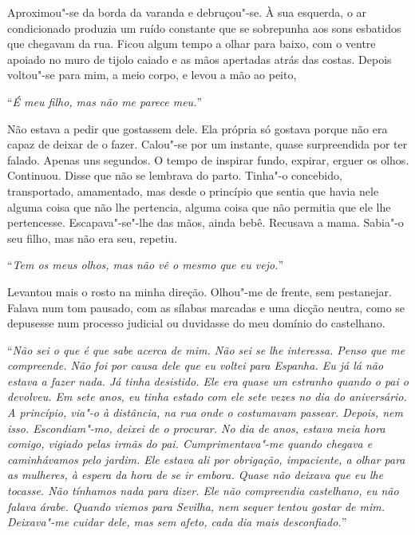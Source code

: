 Aproximou"-se da borda da varanda e debruçou"-se. À sua esquerda, o ar
condicionado produzia um ruído constante que se sobrepunha aos sons
esbatidos que chegavam da rua. Ficou algum tempo a olhar para baixo, com
o ventre apoiado no muro de tijolo caiado e as mãos apertadas atrás das
costas. Depois voltou"-se para mim, a meio corpo, e levou a mão ao
peito,

``\emph{É meu filho, mas não me parece meu.}''

Não estava a pedir que gostassem dele. Ela própria só gostava porque não
era capaz de deixar de o fazer. Calou"-se por um instante, quase
surpreendida por ter falado. Apenas uns segundos. O tempo de inspirar
fundo, expirar, erguer os olhos. Continuou. Disse que não se lembrava do
parto. Tinha"-o concebido, transportado, amamentado, mas desde o
princípio que sentia que havia nele alguma coisa que não lhe pertencia,
alguma coisa que não permitia que ele lhe pertencesse. Escapava"-se"-lhe
das mãos, ainda bebê. Recusava a mama. Sabia"-o seu filho, mas não era
seu, repetiu.

``\emph{Tem os meus olhos, mas não vê o mesmo que eu vejo.}''

Levantou mais o rosto na minha direção. Olhou"-me de frente, sem
pestanejar. Falava num tom pausado, com as sílabas marcadas e uma dicção
neutra, como se depusesse num processo judicial ou duvidasse do meu
domínio do castelhano.

``\emph{Não sei o que é que sabe acerca de mim. Não sei se lhe interessa.
Penso que me compreende. Não foi por causa dele que eu voltei para
Espanha. Eu já lá não estava a fazer nada. Já tinha desistido. Ele era
quase um estranho quando o pai o devolveu. Em sete anos, eu tinha
estado com ele sete vezes no dia do aniversário. A princípio, via"-o à
distância, na rua onde o costumavam passear. Depois, nem isso.
Escondiam"-mo, deixei de o procurar. No dia de anos, estava meia hora
comigo, vigiado pelas irmãs do pai. Cumprimentava"-me quando chegava e
caminhávamos pelo jardim. Ele estava ali por obrigação, impaciente, a
olhar para as mulheres, à espera da hora de se ir embora. Quase não
deixava que eu lhe tocasse. Não tínhamos nada para dizer. Ele não
compreendia castelhano, eu não falava árabe. Quando viemos para Sevilha,
nem sequer tentou gostar de mim. Deixava"-me cuidar dele, mas sem
afeto, cada dia mais desconfiado.}''

